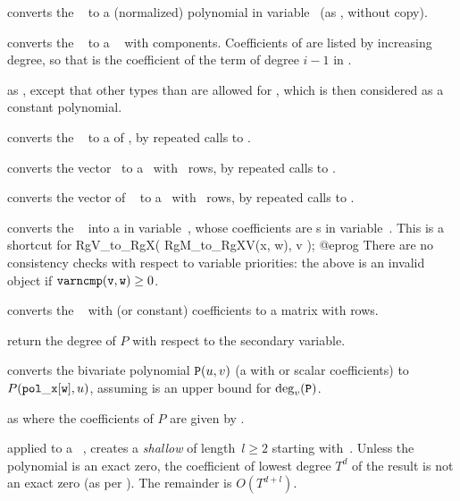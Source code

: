  converts the ~
to a (normalized) polynomial in variable~ (as ,
without copy).

 converts the ~ to a
~ with  components. Coefficients of  are listed
by increasing degree, so that  is the coefficient of the term of
degree $i-1$ in .

 as , except that other
types than  are allowed for , which is then considered as a
constant polynomial.

 converts the ~ to a
 of , by repeated calls to .

 converts the vector~ to
a~ with ~rows, by repeated calls to .

 converts the vector of ~
to a~ with ~rows, by repeated calls to .

 converts the ~ into
a  in variable~, whose coefficients are s in
variable~. This is a shortcut for
\bprog
  RgV_to_RgX( RgM_to_RgXV(x, w), v );
@eprog\noindent
There are no consistency checks with respect to variable
priorities: the above is an invalid object if ${\tt varncmp(v, w)} \geq 0$.

 converts the ~ with
 (or constant) coefficients to a matrix with  rows.

 return the degree of $P$ with respect to
the secondary variable.

 converts the bivariate polynomial
${\tt P}(u,v)$ (a  with  or scalar coefficients) to
$P({\tt pol\_x[w]},u)$, assuming  is an upper bound for
$\deg_v({\tt P})$.

as  where the coefficients of $P$ are given by
.

 applied to a ~, creates
a \emph{shallow}  of length~$l\geq 2$ starting with~.
Unless the polynomial is an exact zero, the coefficient of lowest degree
$T^d$ of the result is not an exact zero (as per ). The
remainder is $O(T^{d+l})$.

